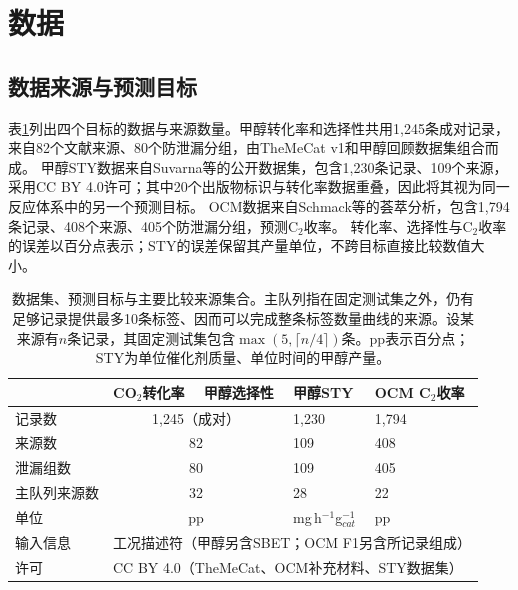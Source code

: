 \documentclass[11pt,a4paper]{article}
\begin{document}
\section{数据}\label{sec:data}
\subsection{数据来源与预测目标}
表\ref{tab:data}列出四个目标的数据与来源数量。甲醇转化率和选择性共用1,245条成对记录，来自82个文献来源、80个防泄漏分组，由TheMeCat v1\cite{toldy}和甲醇回顾数据集\cite{yan}组合而成。
甲醇STY数据来自Suvarna等的公开数据集\cite{suvarna}，包含1,230条记录、109个来源，采用CC BY 4.0许可；其中20个出版物标识与转化率数据重叠，因此将其视为同一反应体系中的另一个预测目标。
OCM数据来自Schmack等的荟萃分析\cite{schmack}，包含1,794条记录、408个来源、405个防泄漏分组，预测C$_2$收率。
转化率、选择性与C$_2$收率的误差以百分点表示；STY的误差保留其产量单位，不跨目标直接比较数值大小。
\begin{table}[t]
\centering\small
\caption{数据集、预测目标与主要比较来源集合。主队列指在固定测试集之外，仍有足够记录提供最多10条标签、因而可以完成整条标签数量曲线的来源。设某来源有$n$条记录，其固定测试集包含$\max(5,\lceil n/4\rceil)$条。pp表示百分点；STY为单位催化剂质量、单位时间的甲醇产量。}
\label{tab:data}
\begin{tabularx}{\linewidth}{lXXXX}
\toprule
 & CO$_2$转化率 & 甲醇选择性 & 甲醇STY & OCM C$_2$收率 \\
\midrule
记录数 & \multicolumn{2}{c}{1{,}245（成对）} & 1{,}230 & 1{,}794 \\
来源数 & \multicolumn{2}{c}{82} & 109 & 408 \\
泄漏组数 & \multicolumn{2}{c}{80} & 109 & 405 \\
主队列来源数 & \multicolumn{2}{c}{32} & 28 & 22 \\
单位 & \multicolumn{2}{c}{pp} & mg\,h$^{-1}$g$_{cat}^{-1}$ & pp \\
输入信息 & \multicolumn{4}{l}{工况描述符（甲醇另含SBET；OCM F1另含所记录组成）} \\
许可 & \multicolumn{4}{l}{CC BY 4.0（TheMeCat、OCM补充材料、STY数据集）} \\
\bottomrule
\end{tabularx}
\end{table}
\end{document}
